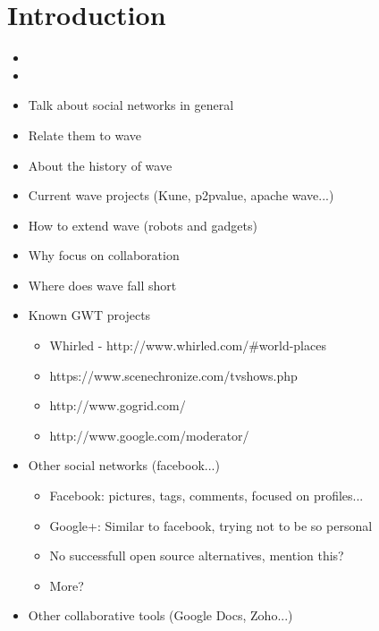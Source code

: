 \newpage
{}
\section{Introduction}

\begin{itemize}
\item {}
\item {}
  \item Talk about social networks in general
  \item Relate them to wave
  \item About the history of wave
  \item Current wave projects (Kune, p2pvalue, apache wave...)
  \item How to extend wave (robots and gadgets)
  \item Why focus on collaboration
  \item Where does wave fall short  
  \item Known GWT projects
  \begin{itemize}
    \item Whirled - http://www.whirled.com/\#world-places
    \item https://www.scenechronize.com/tvshows.php
    \item http://www.gogrid.com/
    \item http://www.google.com/moderator/
  \end{itemize}
  \item Other social networks (facebook...)
  \begin{itemize}
    \item Facebook: pictures, tags, comments, focused on profiles...
    \item Google+: Similar to facebook, trying not to be so personal
    \item No successfull open source alternatives, mention this?
    \item More?
  \end{itemize}
  \item Other collaborative tools (Google Docs, Zoho...)

\end{itemize}
